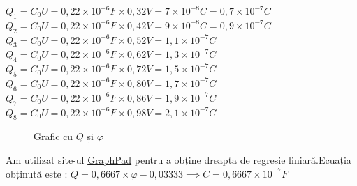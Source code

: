 \documentclass[12pt]{article}
\begin{document}
$Q_{1} = C_{0}U=0,22 \times 10^{-6}F \times 0,32V = 7 \times 10^{-8}C = 0,7 \times 10^{-7}C $\\
$Q_{2} = C_{0}U=0,22 \times 10^{-6}F \times 0,42V = 9 \times 10^{-8}C = 0,9 \times 10^{-7}C $\\
$Q_{3} = C_{0}U=0,22 \times 10^{-6}F \times 0,52V = 1,1 \times 10^{-7}C$\\
$Q_{4} = C_{0}U=0,22 \times 10^{-6}F \times 0,62V = 1,3 \times 10^{-7}C$\\
$Q_{5} = C_{0}U=0,22 \times 10^{-6}F \times 0,72V = 1,5 \times 10^{-7}C$\\
$Q_{6} = C_{0}U=0,22 \times 10^{-6}F \times 0,80V = 1,7 \times 10^{-7}C$\\
$Q_{7} = C_{0}U=0,22 \times 10^{-6}F \times 0,86V = 1,9 \times 10^{-7}C$\\
$Q_{8} = C_{0}U=0,22 \times 10^{-6}F \times 0,98V = 2,1 \times 10^{-7}C$\\

\begin{figure}[H]
    \centering
    \caption{Grafic cu $Q$ și $\varphi$}
    \label{fig:Q_vs_rho}
\end{figure}

Am utilizat site-ul \href{https://www.graphpad.com}{GraphPad} pentru a obține dreapta de regresie liniară.Ecuația obținută este : $Q=0,6667 \times \varphi-0,03333 \implies C=0,6667 \times 10^{-7}F$\\
\end{document}
